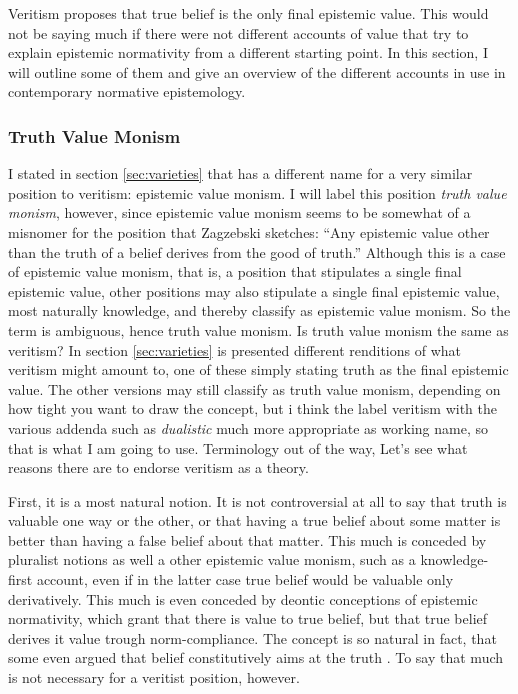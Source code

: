 \documentclass[12pt,numbers=noenddot]{scrartcl}
\begin{document}
Veritism proposes that true belief is the only final epistemic value. This would not be saying much if there were not different accounts of value that try to explain epistemic normativity from a different starting point. In this section, I will outline some of them and give an overview of the different accounts in use in contemporary normative epistemology.

\subsubsection{ Truth Value Monism }
I stated in section \ref{sec:varieties} that \textcite[191]{Zagzebski2004-ZAGEVM-2} has a different name for a very similar position to veritism: epistemic value monism. I will label this position \emph{truth value monism}, however, since epistemic value monism seems to be somewhat of a misnomer for the position that Zagzebski sketches: “Any epistemic value other than the truth of a belief derives from the good of truth.” Although this is a case of epistemic value monism, that is, a position that stipulates a single final epistemic value, other positions may also stipulate a single final epistemic value, most naturally knowledge, and thereby classify as epistemic value monism. So the term is ambiguous, hence truth value monism.
Is truth value monism the same as veritism? In section \ref{sec:varieties} is presented different renditions of what veritism might amount to, one of these simply stating truth as the final epistemic value. The other versions may still classify as truth value monism, depending on how tight you want to draw the concept, but i think the label veritism with the various addenda such as \emph{dualistic} much more appropriate as working name, so that is what I am going to use.
Terminology out of the way, Let's see what reasons there are to endorse veritism as a theory.

First, it is a most natural notion. It is not controversial at all to say that truth is valuable one way or the other, or that having a true belief about some matter is better than having a false belief about that matter. This much is conceded by pluralist notions as well a other epistemic value monism, such as a knowledge-first account, even if in the latter case true belief would be valuable only derivatively. This much is even conceded by deontic conceptions of epistemic normativity, which grant that there is value to true belief, but that true belief derives it value trough norm-compliance. The concept is so natural in fact, that some even argued that belief constitutively aims at the truth \autocite{Shah2003-SHAHTG,Velleman2000-VELOTA}. To say that much is not necessary for a veritist position, however.
\end{document}
